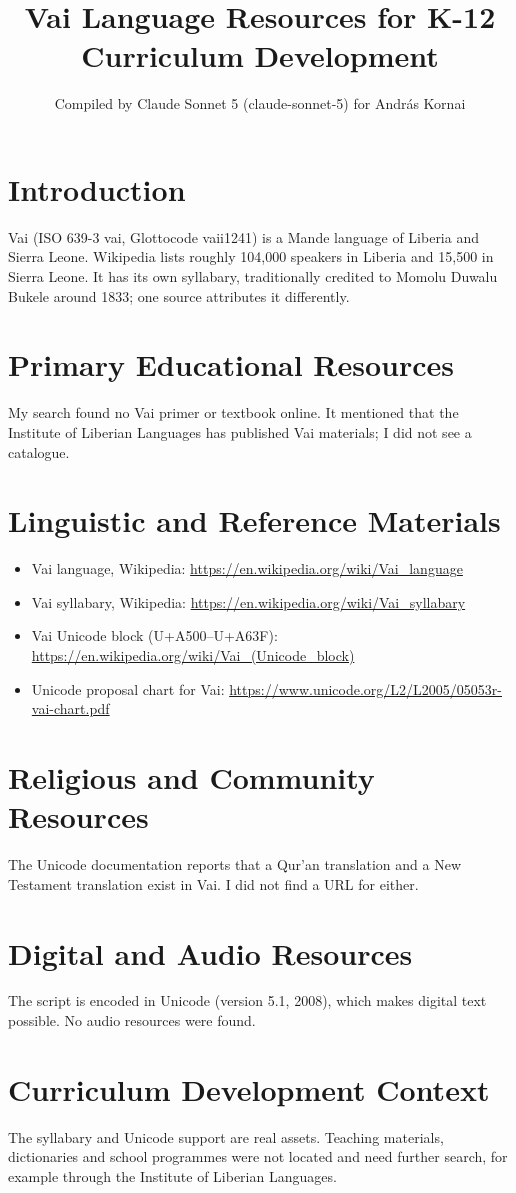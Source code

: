 \documentclass[12pt]{article}
\title{Vai Language Resources for K-12 Curriculum Development}
\author{Compiled by Claude Sonnet 5 (claude-sonnet-5) for Andr\'as Kornai}
\date{}
\begin{document}
\maketitle
\section{Introduction}
Vai (ISO 639-3 vai, Glottocode vaii1241) is a Mande language of Liberia and Sierra Leone. Wikipedia lists roughly 104,000 speakers in Liberia and 15,500 in Sierra Leone. It has its own syllabary, traditionally credited to Momolu Duwalu Bukele around 1833; one source attributes it differently.
\section{Primary Educational Resources}
My search found no Vai primer or textbook online. It mentioned that the Institute of Liberian Languages has published Vai materials; I did not see a catalogue.
\section{Linguistic and Reference Materials}
\begin{itemize}
\item Vai language, Wikipedia: \url{https://en.wikipedia.org/wiki/Vai_language}
\item Vai syllabary, Wikipedia: \url{https://en.wikipedia.org/wiki/Vai_syllabary}
\item Vai Unicode block (U+A500--U+A63F): \url{https://en.wikipedia.org/wiki/Vai_(Unicode_block)}
\item Unicode proposal chart for Vai: \url{https://www.unicode.org/L2/L2005/05053r-vai-chart.pdf}
\end{itemize}
\section{Religious and Community Resources}
The Unicode documentation reports that a Qur'an translation and a New Testament translation exist in Vai. I did not find a URL for either.
\section{Digital and Audio Resources}
The script is encoded in Unicode (version 5.1, 2008), which makes digital text possible. No audio resources were found.
\section{Curriculum Development Context}
The syllabary and Unicode support are real assets. Teaching materials, dictionaries and school programmes were not located and need further search, for example through the Institute of Liberian Languages.
\end{document}
